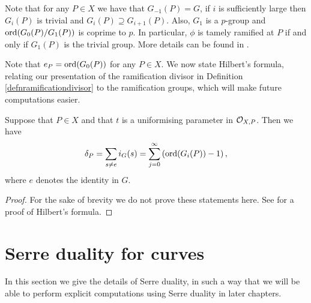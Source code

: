 Note that for any $P\in X$ we have that $G_{-1}(P)=G$, if $i$ is sufficiently large then $G_i(P)$ is trivial and $G_i(P)\supseteq G_{i+1}(P)$.
Also, $G_1$ is a $p$-group and $\operatorname{ord}(G_0(P)/G_1(P))$ is coprime to $p$.
In particular, $\phi$ is tamely ramified at $P$ if and only if $G_1(P)$ is the trivial group.
More details can be found in \cite[Chap. IV, \S 1]{localfields}.%

Note that $e_P = \operatorname{ord} (G_0(P))$ for any $P \in X$.
We now state Hilbert's formula, relating our presentation of the ramification divisor in Definition \ref{defnramificationdivisor} to the ramification groups, which will make future computations easier.


    \begin{thm}\label{hilbertsformula}
    Suppose that $P\in X$ and that $t$ is a uniformising parameter in ${\cal O}_{X,P}$.
    Then we have
        \begin{equation}
        \delta_P = \sum_{s\neq e}i_G(s)=\sum_{j=0}^{\infty}\left(\operatorname{ord}(G_i(P))-1\right),\label{ramdiv}
        \end{equation}
    where $e$ denotes the identity in $G$.
    \end{thm}
    \begin{proof}
    For the sake of brevity we do not prove these statements here. See \cite[Chap. IV, \S 1, Prop. 4]{localfields} for a proof of Hilbert's formula.
    \end{proof}

 
\section{Serre duality for curves}

In this section we give the details of Serre duality, in such a way that we will be able to perform explicit computations using Serre duality in later chapters.


